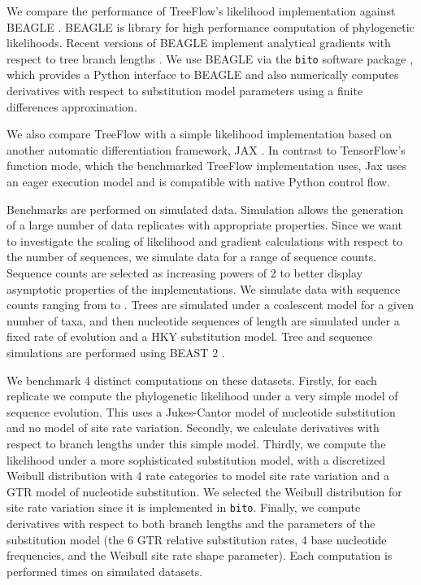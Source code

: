 We compare the performance of TreeFlow's likelihood implementation against BEAGLE \cite{ayres2019beagle}. BEAGLE is library for high performance computation of phylogenetic likelihoods. Recent versions of BEAGLE implement analytical gradients with respect to tree branch lengths \cite{ji2020gradients}. We use BEAGLE via the \texttt{bito} software package \cite{bito}, which provides a Python interface to BEAGLE and also numerically computes derivatives with respect to substitution model parameters using a finite differences approximation.

We also compare TreeFlow with a simple likelihood implementation \cite{phylojax} based on another automatic differentiation framework, JAX \cite{jax2018github}. In contrast to TensorFlow's function mode, which the benchmarked TreeFlow implementation uses, Jax uses an eager execution model and is compatible with native Python control flow.

Benchmarks are performed on simulated data. Simulation allows the generation of a large number of data replicates with appropriate properties. Since we want to investigate the scaling of likelihood and gradient calculations with respect to the number of sequences, we simulate data for a range of sequence counts. Sequence counts are selected as increasing powers of 2 to better display asymptotic properties of the implementations. We simulate data with sequence counts ranging from  to . Trees are simulated under a coalescent model for a given number of taxa, and then nucleotide sequences of length  are simulated under a fixed rate of evolution and a HKY substitution model. Tree and sequence simulations are performed using BEAST 2 \cite{bouckaert2019beast}.

We benchmark 4 distinct computations on these datasets. Firstly, for each replicate we compute the phylogenetic likelihood under a very simple model of sequence evolution. This uses a Jukes-Cantor model of nucleotide substitution and no model of site rate variation. Secondly, we calculate derivatives with respect to branch lengths under this simple model. Thirdly, we compute the likelihood under a more sophisticated substitution model, with a discretized Weibull distribution with 4 rate categories to model site rate variation and a GTR model of nucleotide substitution. We selected the Weibull distribution for site rate variation since it is implemented in \texttt{bito}. Finally, we compute derivatives with respect to both branch lengths and the parameters of the substitution model (the 6 GTR relative substitution rates, 4 base nucleotide frequencies, and the Weibull site rate shape parameter). Each computation is performed  times on  simulated datasets.


